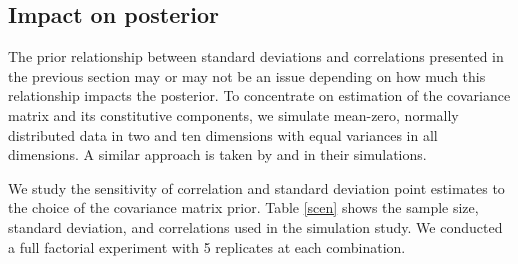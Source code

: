 \documentclass[12pt]{article}
\begin{document}



\subsection{Impact on posterior} 

The prior relationship between standard deviations and correlations presented in the previous section may or may not be an issue depending on how much this relationship impacts the posterior. To concentrate on estimation of the covariance matrix and its constitutive components, we simulate mean-zero, normally distributed data in two and ten dimensions with equal variances in all dimensions. A similar approach is taken by  \cite{daniels1999} and \cite{matilde} in their simulations.

We study the sensitivity of correlation and standard deviation point estimates to the choice of the covariance matrix prior. Table \ref{scen} shows the sample size, standard deviation, and correlations used in the simulation study. We conducted a full factorial experiment with 5 replicates at each combination.
\end{document}
